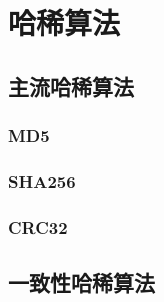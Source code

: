 \chapter{哈稀算法}
\section{主流哈稀算法}
\subsection{MD5}
\subsection{SHA256}
\subsection{CRC32}
\section{一致性哈稀算法}
